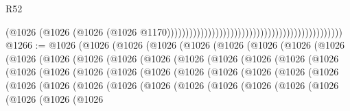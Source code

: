 \begin{lexlean}{R52}
\begin{coremodule}
                                                                                          (@1026
                                                                                            (@1026
                                                                                              (@1026
                                                                                                (@1026
                                                                                                  @1170)))))))))))))))))))))))))))))))))))))))))))))))
@1266 := @1026
    (@1026
      (@1026
        (@1026
          (@1026
            (@1026
              (@1026
                (@1026
                  (@1026
                    (@1026
                      (@1026
                        (@1026
                          (@1026
                            (@1026
                              (@1026
                                (@1026
                                  (@1026
                                    (@1026
                                      (@1026
                                        (@1026
                                          (@1026
                                            (@1026
                                              (@1026
                                                (@1026
                                                  (@1026
                                                    (@1026
                                                      (@1026
                                                        (@1026
                                                          (@1026
                                                            (@1026
                                                              (@1026
                                                                (@1026
                                                                  (@1026
                                                                    (@1026
                                                                      (@1026
                                                                        (@1026
                                                                          (@1026
                                                                            (@1026
                                                                              (@1026
                                                                                (@1026
                                                                                  (@1026
                                                                                    (@1026

\end{coremodule}
\end{lexlean}
